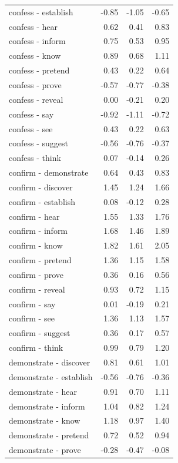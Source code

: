 \begin{longtable}{lrrr}
  confess - establish & -0.85 & -1.05 & -0.65 \\ 
  confess - hear & 0.62 & 0.41 & 0.83 \\ 
  confess - inform & 0.75 & 0.53 & 0.95 \\ 
  confess - know & 0.89 & 0.68 & 1.11 \\ 
  confess - pretend & 0.43 & 0.22 & 0.64 \\ 
  confess - prove & -0.57 & -0.77 & -0.38 \\ 
  confess - reveal & 0.00 & -0.21 & 0.20 \\ 
  confess - say & -0.92 & -1.11 & -0.72 \\ 
  confess - see & 0.43 & 0.22 & 0.63 \\ 
  confess - suggest & -0.56 & -0.76 & -0.37 \\ 
  confess - think & 0.07 & -0.14 & 0.26 \\ 
  confirm - demonstrate & 0.64 & 0.43 & 0.83 \\ 
  confirm - discover & 1.45 & 1.24 & 1.66 \\ 
  confirm - establish & 0.08 & -0.12 & 0.28 \\ 
  confirm - hear & 1.55 & 1.33 & 1.76 \\ 
  confirm - inform & 1.68 & 1.46 & 1.89 \\ 
  confirm - know & 1.82 & 1.61 & 2.05 \\ 
  confirm - pretend & 1.36 & 1.15 & 1.58 \\ 
  confirm - prove & 0.36 & 0.16 & 0.56 \\ 
  confirm - reveal & 0.93 & 0.72 & 1.15 \\ 
  confirm - say & 0.01 & -0.19 & 0.21 \\ 
  confirm - see & 1.36 & 1.13 & 1.57 \\ 
  confirm - suggest & 0.36 & 0.17 & 0.57 \\ 
  confirm - think & 0.99 & 0.79 & 1.20 \\ 
  demonstrate - discover & 0.81 & 0.61 & 1.01 \\ 
  demonstrate - establish & -0.56 & -0.76 & -0.36 \\ 
  demonstrate - hear & 0.91 & 0.70 & 1.11 \\ 
  demonstrate - inform & 1.04 & 0.82 & 1.24 \\ 
  demonstrate - know & 1.18 & 0.97 & 1.40 \\ 
  demonstrate - pretend & 0.72 & 0.52 & 0.94 \\ 
  demonstrate - prove & -0.28 & -0.47 & -0.08 \\ 

\end{longtable}
